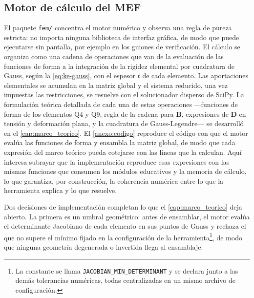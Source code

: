 \subsection{Motor de cálculo del MEF}
\label{sec:motor}

El paquete \texttt{fem/} concentra el motor numérico y observa una regla de pureza estricta: no importa ninguna biblioteca de interfaz gráfica, de modo que puede ejecutarse sin pantalla, por ejemplo en los guiones de verificación. El cálculo se organiza como una cadena de operaciones que van de la evaluación de las funciones de forma a la integración de la rigidez elemental por cuadratura de Gauss, según la \autoref{eq:ke-gauss}, con el espesor $t$ de cada elemento. Las aportaciones elementales se acumulan en la matriz global y el sistema reducido, una vez impuestas las restricciones, se resuelve con el solucionador disperso de SciPy. La formulación teórica detallada de cada una de estas operaciones —funciones de forma de los elementos Q4 y Q9, regla de la cadena para $\bm{B}$, expresiones de $\bm{D}$ en tensión y deformación plana, y la cuadratura de Gauss-Legendre— se desarrolló en el \autoref{cap:marco_teorico}. El \autoref{anexo:codigo} reproduce el código con que el motor evalúa las funciones de forma y ensambla la matriz global, de modo que cada expresión del marco teórico pueda cotejarse con las líneas que la calculan. Aquí interesa subrayar que la implementación reproduce esas expresiones con las mismas funciones que consumen los módulos educativos y la memoria de cálculo, lo que garantiza, por construcción, la coherencia numérica entre lo que la herramienta explica y lo que resuelve.

Dos decisiones de implementación completan lo que el \autoref{cap:marco_teorico} deja abierto. La primera es un umbral geométrico: antes de ensamblar, el motor evalúa el determinante Jacobiano de cada elemento en sus puntos de Gauss y rechaza el que no supere el mínimo fijado en la configuración de la herramienta\footnote{La constante se llama \texttt{JACOBIAN\_MIN\_DETERMINANT} y se declara junto a las demás tolerancias numéricas, todas centralizadas en un mismo archivo de configuración.}, de modo que ninguna geometría degenerada o invertida llega al ensamblaje.

